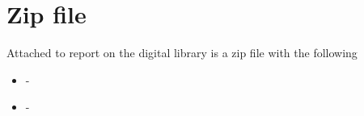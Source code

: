 \chapter{Zip file}\label{chap:zipfile}
Attached to report on the digital library is a zip file with the following

\begin{itemize}
	\item -
	\item -
\end{itemize}